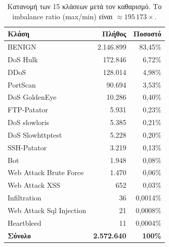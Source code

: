 \documentclass[12pt,a4paper,twoside]{book}
\begin{document}
\begin{table}[H]
    \centering
    \small
    \begin{tabular}{lrr}
        \toprule
        \textbf{Κλάση}                & \textbf{Πλήθος} & \textbf{Ποσοστό} \\
        \midrule
        BENIGN                        & 2.146.899        & 83,45\%          \\
        DoS Hulk                      & 172.846          & 6,72\%           \\
        DDoS                          & 128.014          & 4,98\%           \\
        PortScan                      & 90.694           & 3,53\%           \\
        DoS GoldenEye                 & 10.286           & 0,40\%           \\
        FTP-Patator                   & 5.931            & 0,23\%           \\
        DoS slowloris                 & 5.385            & 0,21\%           \\
        DoS Slowhttptest              & 5.228            & 0,20\%           \\
        SSH-Patator                   & 3.219            & 0,13\%           \\
        Bot                           & 1.948            & 0,08\%           \\
        Web Attack Brute Force        & 1.470            & 0,06\%           \\
        Web Attack XSS                & 652              & 0,03\%           \\
        Infiltration                  & 36               & 0,0014\%         \\
        Web Attack Sql Injection      & 21               & 0,0008\%         \\
        Heartbleed                    & 11               & 0,0004\%         \\
        \midrule
        \textbf{Σύνολο}               & \textbf{2.572.640} & \textbf{100\%}  \\
        \bottomrule
    \end{tabular}
    \caption{Κατανομή των 15 κλάσεων μετά τον καθαρισμό. Το imbalance
    ratio (max/min) είναι \(\approx 195\,173\times\).}
    \label{tab:label_distribution}
\end{table}
\end{document}
